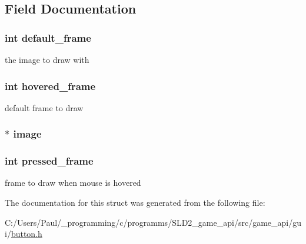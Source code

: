 \subsection{Field Documentation}
\hypertarget{struct___button___image___info_ae230b35bb2d14768abde2227b5cbc699}{
\subsubsection[{default\+\_\+frame}]{\setlength{\rightskip}{0pt plus 5cm}int default\+\_\+frame}}\label{struct___button___image___info_ae230b35bb2d14768abde2227b5cbc699}
the image to draw with \hypertarget{struct___button___image___info_af8a5ba21b924c957da4106fe3fcab385}{
\subsubsection[{hovered\+\_\+frame}]{\setlength{\rightskip}{0pt plus 5cm}int hovered\+\_\+frame}}\label{struct___button___image___info_af8a5ba21b924c957da4106fe3fcab385}
default frame to draw \hypertarget{struct___button___image___info_a6592824edb883c79ce94e3267887e361}{
\subsubsection[{image}]{$\ast$ image}}\label{struct___button___image___info_a6592824edb883c79ce94e3267887e361}
\hypertarget{struct___button___image___info_ae1f9cd93a73ff8eff6bdd7319b79e794}{
\subsubsection[{pressed\+\_\+frame}]{\setlength{\rightskip}{0pt plus 5cm}int pressed\+\_\+frame}}\label{struct___button___image___info_ae1f9cd93a73ff8eff6bdd7319b79e794}
frame to draw when mouse is hovered 

The documentation for this struct was generated from the following file\+:\begin{DoxyCompactItemize}
\item 
C\+:/\+Users/\+Paul/\+\_\+programming/c/programms/\+S\+L\+D2\+\_\+game\+\_\+api/src/game\+\_\+api/gui/\hyperlink{button_8h}{button.\+h}\end{DoxyCompactItemize}
